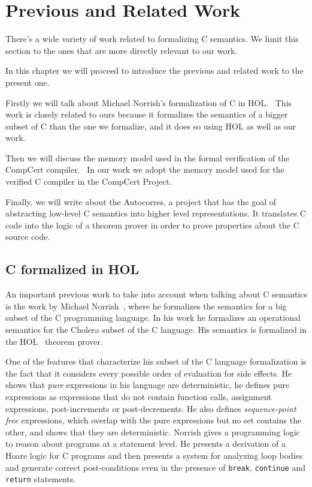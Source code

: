 \chapter{Previous and Related Work}\label{chapter:previous}

There's a wide variety of work related to formalizing C semantics.
We limit this section to the ones that are more directly relevant to our work.

In this chapter we will proceed to introduce the previous and related work to the present one.

Firstly we will talk about Michael Norrish's formalization of C in HOL.~\parencite{norrish}
This work is closely related to ours because it formalizes the semantics of a bigger subset of C than the one we formalize, and it does so using HOL as well as our work.

Then we will discuss the memory model used in the formal verification of the CompCert compiler.~\parencite{leroy-blazy-memory-model}
In our work we adopt the memory model used for the verified C compiler in the CompCert Project.

Finally, we will write about the Autocorres, a project that has the goal of abstracting low-level C semantics into higher level representations.
It translates C code into the logic of a theorem prover in order to prove properties about the C source code.

\section{C formalized in HOL}

An important previous work to take into account when talking about C semantics is the work by Michael Norrish~\parencite{norrish}, where he formalizes the semantics for a big subset of the C programming language.
In his work he formalizes an operational semantics for the Cholera subset of the C language.
His semantics is formalized in the HOL~\parencite{hol-doc} theorem prover.

One of the features that characterize his subset of the C language formalization is the fact that it considers every possible order of evaluation for side effects.
He shows that \textit{pure} expressions in his language are deterministic, he defines pure expressions as expressions that do not contain function calls, assignment expressions, post-increments or post-decrements.
He also defines \textit{sequence-point free} expressions, which overlap with the pure expressions but no set contains the other, and shows that they are deterministic.
Norrish gives a programming logic to reason about programs at a statement level.
He presents a derivation of a Hoare logic for C programs and then presents a system for analyzing loop bodies and generate correct post-conditions even in the presence of \verb|break|, \verb|continue| and \verb|return| statements.

